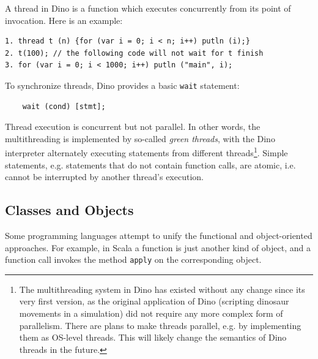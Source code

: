 \documentclass[preprint]{sigplanconf}
\begin{document}
A thread in Dino is a function which executes concurrently from its
point of invocation.  Here is an example:

{\footnotesize
\begin{verbatim}
1. thread t (n) {for (var i = 0; i < n; i++) putln (i);}
2. t(100); // the following code will not wait for t finish
3. for (var i = 0; i < 1000; i++) putln ("main", i);
\end{verbatim}
}

To synchronize threads, Dino provides a basic {\tt wait} statement:

{\footnotesize
\begin{verbatim}
    wait (cond) [stmt];
\end{verbatim}
}

Thread execution is concurrent but not parallel. In other words, the multithreading
is implemented by so-called \emph{green threads}, with the Dino interpreter alternately executing statements from different threads\footnote{The multithreading system in Dino
has existed without any change since its very first version,
as the original application of Dino (scripting dinosaur movements in a simulation)
did not require any more complex form of parallelism.
There are plans
to make threads parallel, e.g. by implementing them as OS-level threads.
This will likely change the semantics of Dino threads in the future.}.
Simple statements, e.g. statements that do not contain function calls, are atomic, i.e. cannot be interrupted by another thread's execution.

\subsection{Classes and Objects}

Some programming languages attempt to unify the functional and
object-oriented approaches.  For example, in Scala a function is just
another kind of object,
 and a function call invokes the method {\tt apply} on the
corresponding object.
\end{document}
